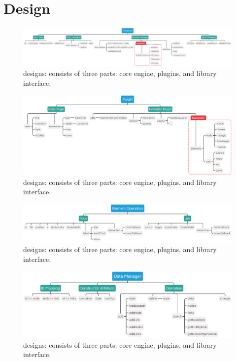 \section{\name Design}
\begin{figure}[htbp]
    \includegraphics[width=\linewidth]{fig/xmind-01.eps}
    \caption{
        \name designs: \name consists of three parts: core engine, plugins, and library interface.
    }
    \label{fig:design}
\end{figure}

\begin{figure}[htbp]
    \includegraphics[width=\linewidth]{fig/xmind-02.eps}
    \caption{
        \name designs: \name consists of three parts: core engine, plugins, and library interface.
    }
    \label{fig:design}
\end{figure}
\begin{figure}[htbp]
    \includegraphics[width=\linewidth]{fig/xmind-03.eps}
    \caption{
        \name designs: \name consists of three parts: core engine, plugins, and library interface.
    }
    \label{fig:design}
\end{figure}
\begin{figure}[htbp]
    \includegraphics[width=\linewidth]{fig/xmind-04.eps}
    \caption{
        \name designs: \name consists of three parts: core engine, plugins, and library interface.
    }
    \label{fig:design}
\end{figure}



